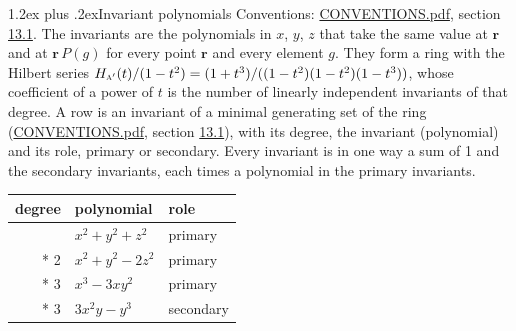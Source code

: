 \documentclass[10pt,a4paper]{article}
\makeatletter
\renewcommand\section{\@startsection{section}{1}{\z@}{-3ex plus -1ex minus -.2ex}%
  {1.2ex plus .2ex}{\normalfont\large\sffamily\bfseries\color{parttitle}}}
\numberwithin{equation}{section}
\newcommand{\irr}[1]{\text{\normalfont\scshape #1}}
\newcommand{\pointr}{\mathbf{r}}
\makeatother
\begin{document}
\section{Invariant polynomials}\label{s:invariant_polynomials}
Conventions: \href{../../CONVENTIONS.pdf}{CONVENTIONS.pdf}, section \href{../../CONVENTIONS.pdf\#conv.13.1}{13.1}.
The invariants are the polynomials in $x$, $y$, $z$ that take the same value at $\pointr$ and at $\pointr\,P(g)$ for every point $\pointr$ and every element $g$. They form a ring with the Hilbert series $H_{\irr{a}'}(t)/(1-t^{2}) = (1 + t^{3})/((1-t^{2})(1-t^{2})(1-t^{3}))$, whose coefficient of a power of $t$ is the number of linearly independent invariants of that degree. \label{n:head.degree}\label{n:head.role}A row is an invariant of a minimal generating set of the ring (\href{../../CONVENTIONS.pdf}{CONVENTIONS.pdf}, section \href{../../CONVENTIONS.pdf\#conv.13.1}{13.1}), with its degree, the invariant (polynomial) and its role, primary or secondary. Every invariant is in one way a sum of 1 and the secondary invariants, each times a polynomial in the primary invariants.
{\small\begin{longtable}{@{}rll@{}}\toprule
degree & polynomial & role\\\midrule\endhead
\bottomrule\endfoot\endlastfoot
2 & $x^{2} + y^{2} + z^{2}$ & primary\\*
2 & $x^{2} + y^{2} - 2z^{2}$ & primary\\*
3 & $x^{3} - 3xy^{2}$ & primary\\*
3 & $3x^{2}y - y^{3}$ & secondary\\
\bottomrule\end{longtable}}
\end{document}

